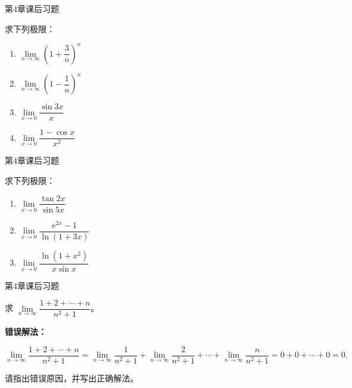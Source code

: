 \documentclass[aspectratio=169,10pt,fontset=fandol]{ctexbeamer}
\newcommand{\ee}{\mathrm{e}}
\begin{document}
\begin{frame}[t,fragile]{第4章课后习题}
\normalsize
{\normalsize
求下列极限：

\begin{enumerate}

\item \(\lim\limits_{n\to\infty} \left(1 + \dfrac{3}{n}\right)^n\)

\item \(\lim\limits_{n\to\infty} \left(1 - \dfrac{1}{n}\right)^n\)

\item \(\lim\limits_{x\to 0} \dfrac{\sin 3x}{x}\)

\item \(\lim\limits_{x\to 0} \dfrac{1 - \cos x}{x^2}\)

\end{enumerate}


}
\end{frame}
\begin{frame}[t,fragile]{第4章课后习题}
\normalsize
{\normalsize
求下列极限：

\begin{enumerate}

\item \(\lim\limits_{x\to 0} \dfrac{\tan 2x}{\sin 5x}\)

\item \(\lim\limits_{x\to 0} \dfrac{\ee^{2x} - 1}{\ln(1+3x)}\)

\item \(\lim\limits_{x\to 0} \dfrac{\ln(1 + x^2)}{x \sin x}\)

\end{enumerate}


}
\end{frame}
\begin{frame}[t,fragile]{第4章课后习题}
\normalsize
{\normalsize


求 \(\lim\limits_{n\to\infty} \dfrac{1 + 2 + \cdots + n}{n^2 + 1}\)。



\textbf{错误解法：}

\[

\lim_{n\to\infty} \dfrac{1 + 2 + \cdots + n}{n^2 + 1} = \lim_{n\to\infty} \dfrac{1}{n^2+1} + \lim_{n\to\infty} \dfrac{2}{n^2+1} + \cdots + \lim_{n\to\infty} \dfrac{n}{n^2+1} = 0 + 0 + \cdots + 0 = 0.

\]



请指出错误原因，并写出正确解法。


}
\end{frame}
\end{document}
